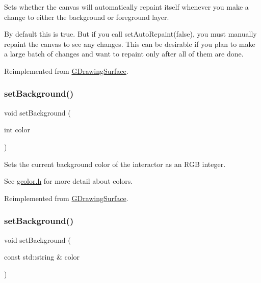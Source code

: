 Sets whether the canvas will automatically repaint itself whenever you make a change to either the background or foreground layer. 

By default this is true. But if you call set\+Auto\+Repaint(false), you must manually repaint the canvas to see any changes. This can be desirable if you plan to make a large batch of changes and want to repaint only after all of them are done. 

Reimplemented from \mbox{\hyperlink{classGDrawingSurface_adf10848319457bd6df4c657bf8872bee}{G\+Drawing\+Surface}}.

\mbox{\label{classGCanvas_a427fefbbc34e39e5df27a807da488e0d}} 
\subsubsection{\texorpdfstring{set\+Background()}{setBackground()}\hspace{0.1cm}{\footnotesize\ttfamily [1/2]}}
{\footnotesize\ttfamily void set\+Background (\begin{DoxyParamCaption}\item[{int}]{color }\end{DoxyParamCaption})\hspace{0.3cm}{\ttfamily [virtual]}}



Sets the current background color of the interactor as an R\+GB integer. 

See \mbox{\hyperlink{gcolor_8h_source}{gcolor.\+h}} for more detail about colors. 

Reimplemented from \mbox{\hyperlink{classGDrawingSurface_aba673fd56570a074aba10fa059524b96}{G\+Drawing\+Surface}}.

\mbox{\label{classGCanvas_a222fcfb542aa6094c7e0de671bd69627}} 
\subsubsection{\texorpdfstring{set\+Background()}{setBackground()}\hspace{0.1cm}{\footnotesize\ttfamily [2/2]}}
{\footnotesize\ttfamily void set\+Background (\begin{DoxyParamCaption}\item[{const std\+::string \&}]{color }\end{DoxyParamCaption})\hspace{0.3cm}{\ttfamily [virtual]}}



